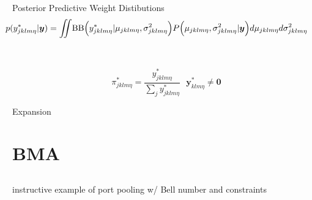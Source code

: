 \documentclass[ xcolor = pdftex, dvipsnames, table ]{beamer}
\begin{document}
\subsection{}
\begin{frame}{Posterior Predictive Weight Distibutions}
\vspace{-0.5cm}
\begin{equation*}
\hspace{-0.8cm}
p(y^*_{jklm\eta}|\bm{y}) = \int\!\!\!\!\int\! \text{BB}\Big( y^*_{jklm\eta}|\mu_{jklm\eta}, \sigma^2_{jklm\eta} \Big) P\Big(\mu_{jklm\eta}, \sigma^2_{jklm\eta} | \bm{y}\Big) d\mu_{jklm\eta} d\sigma^2_{jklm\eta}
\end{equation*}

\color{red}{motivate prediction for filling holes/hindcasting}\\
\color{red}{show a 100 pound BCAC distribution}

\end{frame}

%
%

\begin{frame}
\begin{equation*}
\pi^*_{jklm\eta} = \frac{y^*_{jklm\eta}}{\sum_j y^*_{jklm\eta}} ~~~ \bm{y}^*_{klm\eta}\neq \bm{0}
\end{equation*}
\color{red}{show sppComp distribution for some strata}
\end{frame}

%
%

\begin{frame}{}
\color{red} Expansion
\end{frame}

%
%

\section{BMA}
\subsection{}
\begin{frame}
\color{red} instructive example of port pooling w/ Bell number and constraints
\end{frame}
\end{document}
